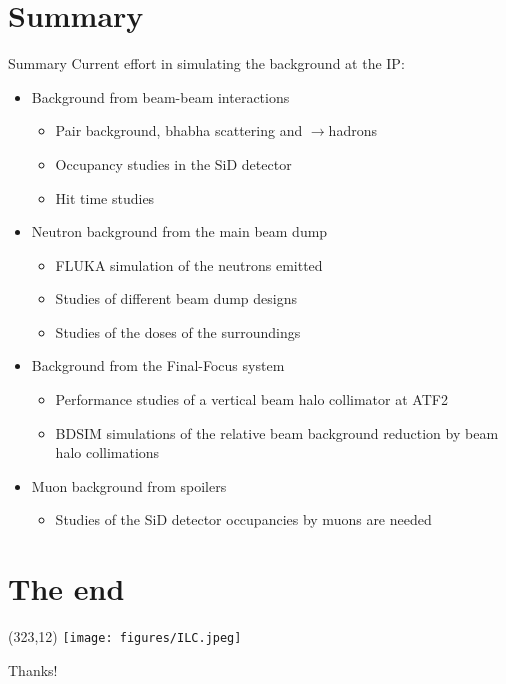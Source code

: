 \documentclass[xcolor={dvipsnames}]{beamer}
\newcommand{\ilclogo}{
  \setlength{\TPHorizModule}{1pt}
  \setlength{\TPVertModule}{1pt}
  \begin{textblock}{1}(323,12)
   \texttt{[image: figures/ILC.jpeg]}
  \end{textblock}
}
\begin{document}
\section*{Summary}
\begin{frame}{Summary}
Current effort in simulating the background at the IP:
 \begin{itemize}
  \item Background from beam-beam interactions
    \begin{itemize}
      \item Pair background, bhabha scattering and \textgamma\textgamma$\rightarrow$hadrons
      \item Occupancy studies in the SiD detector
      \item Hit time studies
    \end{itemize}
  \item Neutron background from the main beam dump
      \begin{itemize}
      \item FLUKA simulation of the neutrons emitted
      \item Studies of different beam dump designs
      \item Studies of the doses of the surroundings
    \end{itemize}
  \item Background from the Final-Focus system
    \begin{itemize}
      \item Performance studies of a vertical beam halo collimator at ATF2
      \item BDSIM simulations of the relative beam background reduction by beam halo collimations
    \end{itemize}
  \item Muon background from spoilers
  \begin{itemize}
   \item Studies of the SiD detector occupancies by muons are needed
  \end{itemize}

 \end{itemize}
 
 
\end{frame}




\section*{The end}
{
\begin{frame}
\ilclogo
\begin{center}
\textcolor{RubineRed}{
	\LARGE Thanks!\\
}
\end{center}
\end{frame}
}
\end{document}
